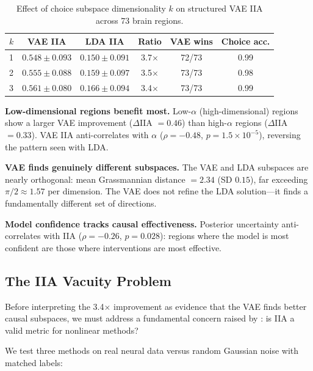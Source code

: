 \documentclass{article}
\begin{document}
\begin{table}[h]
\centering
\small
\caption{Effect of choice subspace dimensionality $k$ on structured VAE IIA across 73 brain regions.}
\label{tab:vae_k_ablation}
\begin{tabular}{lccccc}
\toprule
$k$ & VAE IIA & LDA IIA & Ratio & VAE wins & Choice acc. \\
\midrule
1 & $0.548 \pm 0.093$ & $0.150 \pm 0.091$ & 3.7$\times$ & 72/73 & 0.99 \\
2 & $0.555 \pm 0.088$ & $0.159 \pm 0.097$ & 3.5$\times$ & 73/73 & 0.98 \\
3 & $0.561 \pm 0.080$ & $0.166 \pm 0.094$ & 3.4$\times$ & 73/73 & 0.99 \\
\bottomrule
\end{tabular}
\end{table}

\textbf{Low-dimensional regions benefit most.} Low-$\alpha$ (high-dimensional) regions show a larger VAE improvement ($\Delta$IIA $= 0.46$) than high-$\alpha$ regions ($\Delta$IIA $= 0.33$). VAE IIA anti-correlates with $\alpha$ ($\rho = -0.48$, $p = 1.5 \times 10^{-5}$), reversing the pattern seen with LDA.

\textbf{VAE finds genuinely different subspaces.} The VAE and LDA subspaces are nearly orthogonal: mean Grassmannian distance $= 2.34$ (SD $0.15$), far exceeding $\pi/2 \approx 1.57$ per dimension. The VAE does not refine the LDA solution---it finds a fundamentally different set of directions.

\textbf{Model confidence tracks causal effectiveness.} Posterior uncertainty anti-correlates with IIA ($\rho = -0.26$, $p = 0.028$): regions where the model is most confident are those where interventions are most effective.

\subsection{The IIA Vacuity Problem}
\label{sec:vacuity}

Before interpreting the 3.4$\times$ improvement as evidence that the VAE finds better causal subspaces, we must address a fundamental concern raised by \citet{sutter2025iia}: is IIA a valid metric for nonlinear methods?

We test three methods on real neural data versus random Gaussian noise with matched labels:
\end{document}
